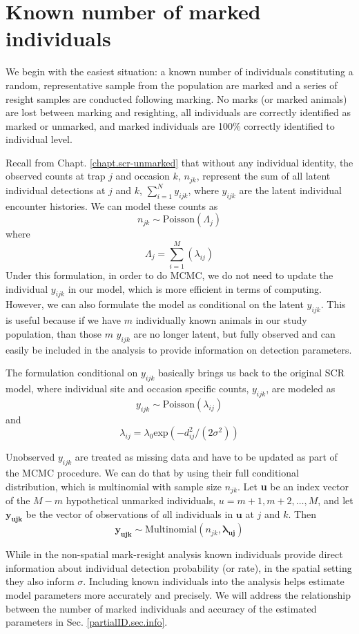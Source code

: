 \section{Known number of marked individuals}

We begin with the easiest situation: a known number of
individuals constituting a random, representative sample from the
population are marked and a series of resight samples are conducted
following marking. No marks (or marked animals) are lost between
marking and resighting, all individuals are correctly identified as
marked or unmarked, and marked individuals are 100\% correctly
identified to individual level.

Recall from Chapt. \ref{chapt.scr-unmarked} that without any individual identity, the observed counts at trap
$j$ and occasion $k$, $n_{jk}$, represent the sum of all latent
individual detections at $j$ and $k$,
$\displaystyle\sum\limits_{i=1}^{N} y_{ijk}$, where $y_{ijk}$ are the
latent individual encounter histories.
We can model these counts as
\[
n_{jk} \sim \mbox{Poisson}( \Lambda_{j} )
\]
where
\[
\Lambda_{j} = \sum_{i=1}^{M}( \lambda_{ij} )
\]
Under this formulation, in order to do MCMC,
 we do not need to update the individual
$y_{ijk}$ in our model, which  is more efficient in terms of
computing. However, we can also formulate the model as conditional on
the latent $y_{ijk}$. This is useful because if we have $m$
individually known animals in our study population, than those $m$
$y_{ijk}$ are no longer latent, but fully observed and can easily be
included in the analysis to provide information on detection parameters.

The formulation conditional on $y_{ijk}$ basically brings us back to
the original SCR model, where individual site and occasion specific
counts, $y_{ijk}$, are modeled as
\[
y_{ijk} \sim \mbox{Poisson}(\lambda _{ij})
\]
and
\[
\lambda _{ij} = \lambda_0  \mbox{exp}(-d_{ij}^2/(2 \sigma^2))
\]


Unobserved $y_{ijk}$ are treated as missing data and have to be
updated as part of the MCMC procedure. We can do that by using their
full conditional distribution, which is multinomial with sample size
$n_{jk}$. Let \textbf{u} be an index vector of the $M-m$ hypothetical
unmarked individuals, $u=m+1, m+2, \ldots, M$, and let $\mathbf{y_{ujk}}$ be the vector of observations of {\emph all} individuals in $\mathbf{u}$ at $j$ and $k$. Then
\[
\mathbf{y_{ujk}} \sim \mbox{Multinomial} (n_{jk}, \mathbf{\lambda_{uj}})
\]

While in the non-spatial mark-resight analysis known individuals
provide direct information about individual detection probability (or
rate), in the spatial setting they also inform
$\sigma$. Including known individuals into the analysis helps estimate
model parameters more accurately and precisely. We will address the
relationship between the number of marked individuals and accuracy of
the estimated parameters in Sec. \ref{partialID.sec.info}.


